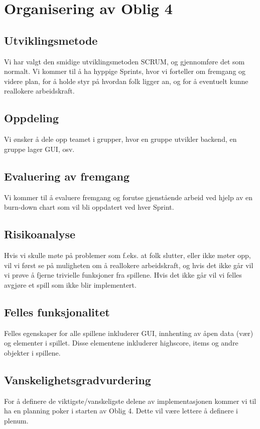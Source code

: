 \documentclass[12pt]{report}
\begin{document}

\section*{Organisering av Oblig 4}

\subsection*{Utviklingsmetode}

Vi har valgt den smidige utviklingsmetoden SCRUM, og gjennomføre det som normalt. 
Vi kommer til å ha hyppige Sprints, hvor vi forteller om fremgang og videre plan, 
for å holde styr på hvordan folk ligger an, og for å eventuelt kunne reallokere arbeidskraft.

\subsection*{Oppdeling}

Vi ønsker å dele opp teamet i grupper, hvor en gruppe utvikler backend, en gruppe lager GUI, osv.

\subsection*{Evaluering av fremgang}

Vi kommer til å evaluere fremgang og forutse gjenstående arbeid 
ved hjelp av en burn-down chart som vil bli oppdatert ved hver Sprint.

\subsection*{Risikoanalyse}

Hvis vi skulle møte på problemer som f.eks. at folk slutter, eller ikke møter opp, 
vil vi først se på muligheten om å reallokere arbeidskraft, 
og hvis det ikke går vil vi prøve å fjerne trivielle funksjoner fra spillene. 
Hvis det ikke går vil vi felles avgjøre et spill som ikke blir implementert.

\subsection*{Felles funksjonalitet}

Felles egenskaper for alle spillene inkluderer GUI, 
innhenting av åpen data (vær) og elementer i spillet.
Disse elementene inkluderer highscore, items og andre objekter i spillene.

\subsection*{Vanskelighetsgradvurdering}

For å definere de viktigste/vanskeligste delene av implementasjonen
kommer vi til ha en planning poker i starten av Oblig 4.
Dette vil være lettere å definere i plenum.
\end{document}
